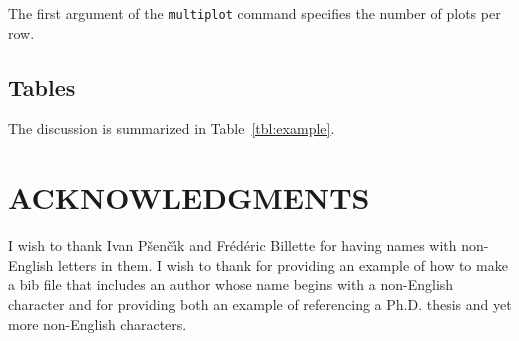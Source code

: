 \documentclass{article}
\begin{document}
The first argument of the \texttt{multiplot} command specifies the
number of plots per row.

\subsection{Tables}

The discussion is summarized in Table~\ref{tbl:example}.


\section{ACKNOWLEDGMENTS}

I wish to thank Ivan P\v{s}en\v{c}\'{\i}k and Fr\'ed\'eric Billette
for having names with non-English letters in them.  I wish to thank
\cite{Cerveny} for providing an example of how to make a bib file that
includes an author whose name begins with a non-English character and
\cite{forgues96} for providing both an example of referencing a Ph.D.
thesis and yet more non-English characters.

\label{example}
\end{document}
